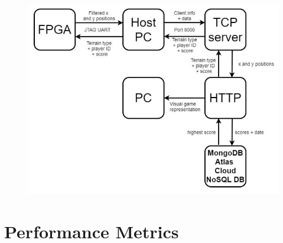 \documentclass[12pt,a4paper]{article}
\begin{document}
\begin{figure} [h!]
    \centering
    \includegraphics[scale = 0.75]{Arch.png}
\end{figure}

\section{\normalsize Performance Metrics}
\end{document}
